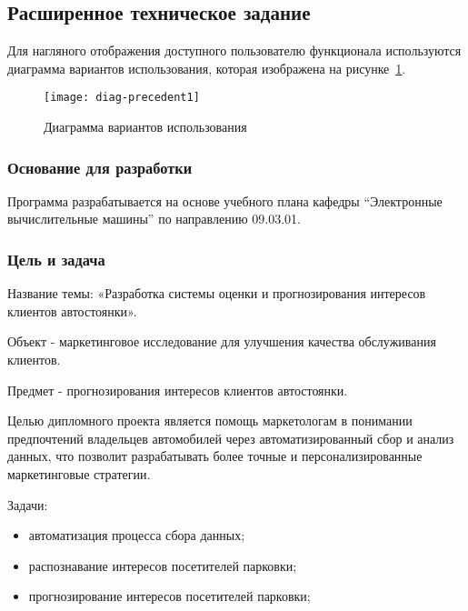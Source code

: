 


\subsection{Расширенное техническое задание}

Для нагляного отображения доступного пользователю функционала используются диаграмма вариантов использования, которая изображена на рисунке~\ref{f:diag-precedent1}.

\begin{figure}[h!]
    \centering
    \vspace{\toppaddingoffigure}
    \texttt{[image: diag-precedent1]}
    \caption{Диаграмма вариантов использования}
    \label{f:diag-precedent1}
\end{figure}

\subsubsection{Основание для разработки}

Программа разрабатывается на основе учебного плана кафедры “Электронные вычислительные машины” по направлению 09.03.01.

\subsubsection{Цель и задача}

Название темы: «Разработка системы оценки и прогнозирования интересов клиентов автостоянки».

Объект - маркетинговое исследование для улучшения качества обслуживания клиентов.


Предмет - прогнозирования интересов клиентов автостоянки.

Целью дипломного проекта является помощь маркетологам в понимании предпочтений владельцев автомобилей через автоматизированный сбор и анализ данных, что позволит разрабатывать более точные и персонализированные маркетинговые стратегии. 

Задачи:
\begin{itemize}
    \item автоматизация процесса сбора данных;
    \item распознавание интересов посетителей парковки;
    \item прогнозирование интересов посетителей парковки;
\end{itemize}

